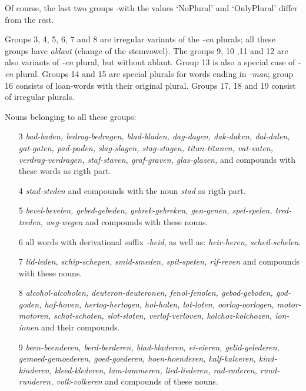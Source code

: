 Of course, the last two groups -with the values `NoPlural' and `OnlyPlural'
differ from the rest.

Groups 3, 4, 5, 6, 7 and 8 are irregular variants of the {\em -en} plurals; all 
these groups have {\em ablaut} (change of the stemvowel). 
The groups 9, 10 ,11 and 12 are also variants of {\em -en} plural, but without 
ablaut. 
Group 13 is also a special case of {\em -en} plural. 
Groups 14 and 15 are special plurals for words 
ending in {\em -man}; group 16 consists of loan-words with their original plural.
Groups 17, 18 and 19 consist of irregular plurals.

Nouns belonging to all these groups:

\begin{itemize}
  \item [3] {\em bad-baden, bedrag-bedragen, blad-bladen, dag-dagen, dak-daken, 
            dal-dalen, gat-gaten, pad-paden, slag-slagen, stag-stagen, 
            titan-titanen, vat-vaten, verdrag-verdragen, staf-staven, 
            graf-graven, glas-glazen,} and compounds with these words as rigth
            part. 

  \item [4] {\em stad-steden} and compounds with the noun {\em stad} as rigth 
            part.

  \item [5] {\em bevel-bevelen, gebed-gebeden, gebrek-gebreken, gen-genen, 
            spel-spelen, tred-treden, weg-wegen} and compounds with these 
            nouns.

  \item [6] all words with derivational suffix {\em -heid}, as well as: 
            {\em heir-heren, scheil-schelen}.

  \item [7] {\em lid-leden, schip-schepen, smid-smeden, spit-speten, rif-reven}
            and compounds with these nouns.

  \item [8] {\em alcohol-alcoholen, deuteron-deuteronen, fenol-fenolen,
            gebod-geboden, god-goden, hof-hoven, hertog-hertogen, hol-holen, 
            lot-loten, oorlog-oorlogen, motor-motoren, schot-schoten, 
            slot-sloten, verlof-verloven, kolchoz-kolchozen, ion-ionen} 
            and their compounds.

  \item [9] {\em been-beenderen, berd-berderen, blad-bladeren, ei-eieren,
            gelid-gelederen, gemoed-gemoederen, goed-goederen, hoen-hoenderen, 
            kalf-kalveren, kind-kinderen, kleed-klederen, lam-lammeren, 
            lied-liederen, rad-raderen, rund-runderen, volk-volkeren} and
            compounds of these nouns.


\end{itemize}
